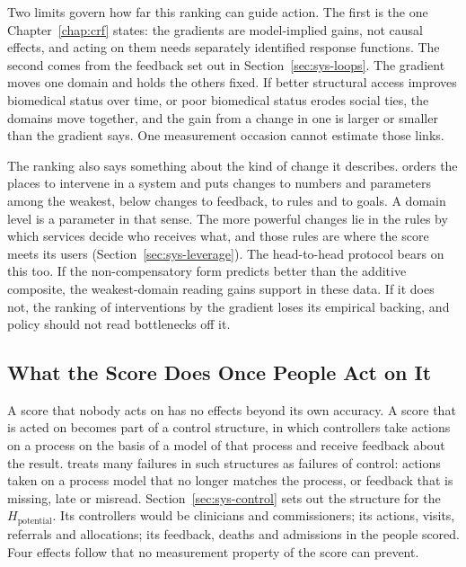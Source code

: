 Two limits govern how far this ranking can guide action. The first is the one
Chapter~\ref{chap:crf} states: the gradients are model-implied gains, not causal
effects, and acting on them needs separately identified response functions. The
second comes from the feedback set out in Section~\ref{sec:sys-loops}. The gradient
moves one domain and holds the others fixed. If better structural access improves
biomedical status over time, or poor biomedical status erodes social ties, the
domains move together, and the gain from a change in one is larger or smaller than
the gradient says. One measurement occasion cannot estimate those links.

The ranking also says something about the kind of change it describes.
\citet{meadows_1999} orders the places to intervene in a system and puts changes to
numbers and parameters among the weakest, below changes to feedback, to rules and to
goals. A domain level is a parameter in that sense. The more powerful changes lie in
the rules by which services decide who receives what, and those rules are where the
score meets its users (Section~\ref{sec:sys-leverage}). The head-to-head protocol
bears on this too. If the non-compensatory form predicts better than the additive
composite, the weakest-domain reading gains support in these data. If it does not,
the ranking of interventions by the gradient loses its empirical backing, and
policy should not read bottlenecks off it.

\subsection{What the Score Does Once People Act on It}
\label{sec:disc-sys-control}

A score that nobody acts on has no effects beyond its own accuracy. A score that
is acted on becomes part of a control structure, in which controllers take actions
on a process on the basis of a model of that process and receive feedback about the
result. \citet{leveson_2011} treats many failures in such structures as failures of
control: actions taken on a process model that no longer matches the process, or
feedback that is missing, late or misread. Section~\ref{sec:sys-control} sets out
the structure for the $H_{\text{potential}}$. Its controllers would be clinicians
and commissioners; its actions, visits, referrals and allocations; its feedback,
deaths and admissions in the people scored. Four effects follow that no measurement
property of the score can prevent.

